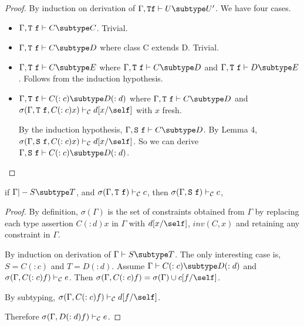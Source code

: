 \begin{proof}
By induction on derivation of $\Gamma, {\tt T} {\tt f} \vdash U \subtype U'$.
We have four cases.
\begin{itemize}
\item
$\Gamma, {\tt T}\ {\tt f} \vdash C \subtype C$.  Trivial.
\item
$\Gamma, {\tt T}\ {\tt f} \vdash C \subtype D$ where class C extends D.  Trivial.
\item
$\Gamma, {\tt T}\ {\tt f} \vdash C \subtype E$ where
    $\Gamma, {\tt T}\ {\tt f} \vdash C \subtype D$ and $\Gamma, {\tt T}\ {\tt f} \vdash D \subtype E$.
    Follows from the induction hypothesis.
\item
$\Gamma, {\tt T}\ {\tt f} \vdash C(:c) \subtype D(:d)$ where
    $\Gamma, {\tt T}\ {\tt f} \vdash C \subtype D$
    and $\sigma(\Gamma, {\tt T}\ {\tt f}, C(:c) x) \vdash_{\cal C} d[x/\self]$ with $x$ fresh.

    By the induction hypothesis, $\Gamma, {\tt S}\ {\tt f} \vdash C \subtype D$.
    By Lemma 4, $\sigma(\Gamma, {\tt S}\ {\tt f}, C(:c) x) \vdash_{\cal C} d[x/\self]$.
    So we can derive $\Gamma, {\tt S}\ {\tt f} \vdash C(:c) \subtype D(:d)$.
\end{itemize}
\end{proof}

\begin{lemma}
\label{lemmafour} %
if   $\Gamma |- S \subtype T$,
and  $\sigma(\Gamma,{\tt T}\ {\tt f}) \vdash_{\cal C} c$,
then $\sigma(\Gamma,{\tt S}\ {\tt f}) \vdash_{\cal C} c$,
\end{lemma}

\begin{proof}
By definition, $\sigma(\Gamma)$ is the set of constraints obtained from $\Gamma$
by replacing each type assertion $C(:d) x$ in $\Gamma$ with $d[x/\self]$, 
$inv(C,x)$ and retaining any constraint in $\Gamma$.

By induction on derivation of $\Gamma \vdash S \subtype T$.
The only interesting case is, $S = C(:c)$ and $T = D(:d)$.
Assume $\Gamma \vdash C(:c) \subtype D(:d)$ and 
$\sigma(\Gamma,C(:c) f) \vdash_{\cal C} e$.
Then $\sigma(\Gamma, C(:c) f) = \sigma(\Gamma) \cup c[f/\self]$.

By subtyping, $\sigma(\Gamma, C(:c) f) \vdash_{\cal C} d[f/\self]$.


Therefore $\sigma(\Gamma,D(:d) f) \vdash_{\cal C} e$.
\end{proof}

